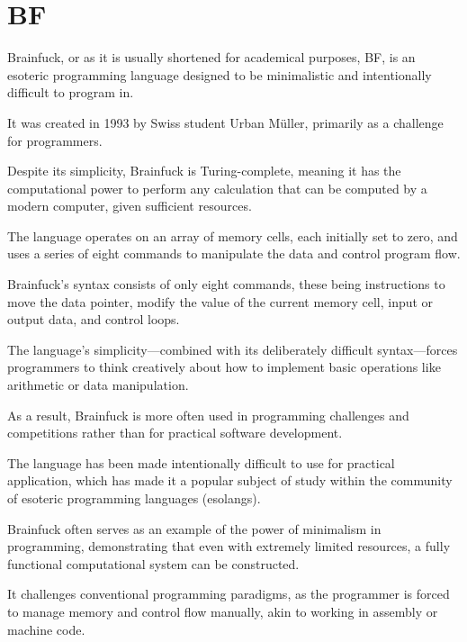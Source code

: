 \chapter{BF}
\label{chap:ch2}

\par Brainfuck, or as it is usually shortened for academical purposes, BF, is an esoteric programming language designed to be minimalistic and intentionally difficult to program in.

\par It was created in 1993 by Swiss student Urban Müller, primarily as a challenge for programmers.

\par Despite its simplicity, Brainfuck is Turing-complete, meaning it has the computational power to perform any calculation that can be computed by a modern computer, given sufficient resources.

\par The language operates on an array of memory cells, each initially set to zero, and uses a series of eight commands to manipulate the data and control program flow.

\par Brainfuck's syntax consists of only eight commands, these being instructions to move the data pointer, modify the value of the current memory cell, input or output data, and control loops.

\par The language's simplicity—combined with its deliberately difficult syntax—forces programmers to think creatively about how to implement basic operations like arithmetic or data manipulation.

\par As a result, Brainfuck is more often used in programming challenges and competitions rather than for practical software development.

\par The language has been made intentionally difficult to use for practical application, which has made it a popular subject of study within the community of esoteric programming languages (esolangs).

\par Brainfuck often serves as an example of the power of minimalism in programming, demonstrating that even with extremely limited resources, a fully functional computational system can be constructed.

\par It challenges conventional programming paradigms, as the programmer is forced to manage memory and control flow manually, akin to working in assembly or machine code.

